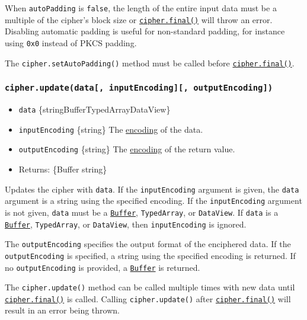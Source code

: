 When \texttt{autoPadding} is \texttt{false}, the length of the entire
input data must be a multiple of the cipher's block size or
\hyperref[cipherfinaloutputencoding]{\texttt{cipher.final()}} will throw
an error. Disabling automatic padding is useful for non-standard
padding, for instance using \texttt{0x0} instead of PKCS padding.

The \texttt{cipher.setAutoPadding()} method must be called before
\hyperref[cipherfinaloutputencoding]{\texttt{cipher.final()}}.

\subsubsection{\texorpdfstring{\texttt{cipher.update(data{[},\ inputEncoding{]}{[},\ outputEncoding{]})}}{cipher.update(data{[}, inputEncoding{]}{[}, outputEncoding{]})}}\label{cipher.updatedata-inputencoding-outputencoding}

\begin{itemize}
\tightlist
\item
  \texttt{data}
  \{string\textbar Buffer\textbar TypedArray\textbar DataView\}
\item
  \texttt{inputEncoding} \{string\} The
  \href{buffer.md\#buffers-and-character-encodings}{encoding} of the
  data.
\item
  \texttt{outputEncoding} \{string\} The
  \href{buffer.md\#buffers-and-character-encodings}{encoding} of the
  return value.
\item
  Returns: \{Buffer \textbar{} string\}
\end{itemize}

Updates the cipher with \texttt{data}. If the \texttt{inputEncoding}
argument is given, the \texttt{data} argument is a string using the
specified encoding. If the \texttt{inputEncoding} argument is not given,
\texttt{data} must be a \href{buffer.md}{\texttt{Buffer}},
\texttt{TypedArray}, or \texttt{DataView}. If \texttt{data} is a
\href{buffer.md}{\texttt{Buffer}}, \texttt{TypedArray}, or
\texttt{DataView}, then \texttt{inputEncoding} is ignored.

The \texttt{outputEncoding} specifies the output format of the
enciphered data. If the \texttt{outputEncoding} is specified, a string
using the specified encoding is returned. If no \texttt{outputEncoding}
is provided, a \href{buffer.md}{\texttt{Buffer}} is returned.

The \texttt{cipher.update()} method can be called multiple times with
new data until
\hyperref[cipherfinaloutputencoding]{\texttt{cipher.final()}} is called.
Calling \texttt{cipher.update()} after
\hyperref[cipherfinaloutputencoding]{\texttt{cipher.final()}} will
result in an error being thrown.

